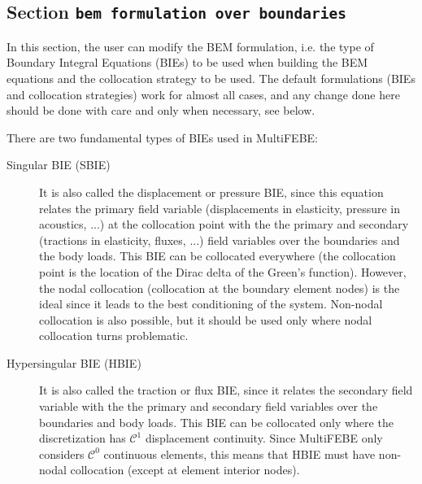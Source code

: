 \documentclass[a4paper,fleqn]{book}
\begin{document}
\subsection{Section \texttt{bem formulation over boundaries}}
\label{sec:bem_formulation_boundaries}

In this section, the user can modify the BEM formulation, i.e. the type of Boundary Integral Equations (BIEs) to be used when building the BEM equations and the collocation strategy to be used. The default formulations (BIEs and collocation strategies) work for almost all cases, and any change done here should be done with care and only when necessary, see below. 

There are two fundamental types of BIEs used in MultiFEBE:
\begin{description}
    
    \item[Singular BIE (SBIE)] It is also called the displacement or pressure BIE, since this equation relates the primary field variable (displacements in elasticity, pressure in acoustics, ...) at the collocation point with the the primary and secondary (tractions in elasticity, fluxes, ...) field variables over the boundaries and the body loads. This BIE can be collocated everywhere (the collocation point is the location of the Dirac delta of the Green's function). However, the nodal collocation (collocation at the boundary element nodes) is the ideal since it leads to the best conditioning of the system. Non-nodal collocation is also possible, but it should be used only where nodal collocation turns problematic. 
    
    \item[Hypersingular BIE (HBIE)] It is also called the traction or flux BIE, since it relates the secondary field variable with the the primary and secondary field variables over the boundaries and body loads. This BIE can be collocated only where the discretization has $\mathcal{C}^1$ displacement continuity. Since MultiFEBE only considers $\mathcal{C}^0$ continuous elements, this means that HBIE must have non-nodal collocation (except at element interior nodes).
    
\end{description}
\end{document}
